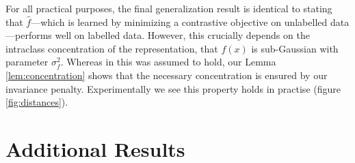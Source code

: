 \documentclass{article}
\newcommand{\feat}{f}
\begin{document}
For all practical purposes, the final generalization result is identical to \citep{saunshi2019theoretical} stating that $\hat{f}$---which is learned by minimizing a contrastive objective on unlabelled data---performs well on labelled data. However, this crucially depends on the intraclass concentration of the representation, that $\feat(x)$ is sub-Gaussian with parameter $\sigma^2_{\feat}$. Whereas in \citep{saunshi2019theoretical} this was assumed to hold, our Lemma \ref{lem:concentration} shows that the necessary concentration is ensured by our invariance penalty. Experimentally we see this property holds in practise (figure \ref{fig:distances}).




 \section{Additional Results} \label{sec:gen-theory_app}
\end{document}
